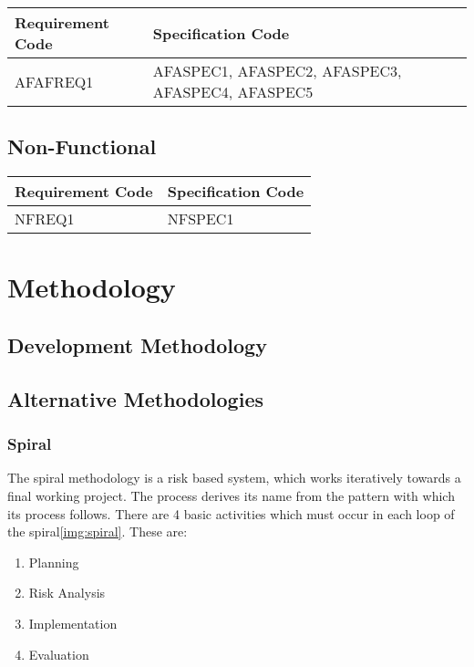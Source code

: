 \documentclass[11pt,a4paper]{article}
\begin{document}
\begin{longtable}{|p{2.7cm}|p{10cm}|}
\hline
\textbf{Requirement Code} & \textbf{Specification Code} \\

\hline \hline AFAFREQ1 & AFASPEC1, AFASPEC2, AFASPEC3, AFASPEC4, AFASPEC5  \\
\hline 
\end{longtable}


\subsection{Non-Functional}

\begin{longtable}{|p{2.7cm}|p{10cm}|}
\hline
\textbf{Requirement Code} & \textbf{Specification Code} \\

\hline \hline NFREQ1 & NFSPEC1\\
\hline 
\end{longtable}


\section{Methodology}
\label{sec:methodologies}

\subsection{Development Methodology}
\subsection{Alternative Methodologies}

\subsubsection{Spiral}

The spiral methodology is a risk based system, which works iteratively towards a final working project. The process derives its name from the pattern with which its process follows. There are 4 basic activities which must occur in each loop of the spiral\ref{img:spiral}. These are:

\begin{enumerate}
  \item Planning
  \item Risk Analysis
  \item Implementation
  \item Evaluation
\end{enumerate}
\end{document}
